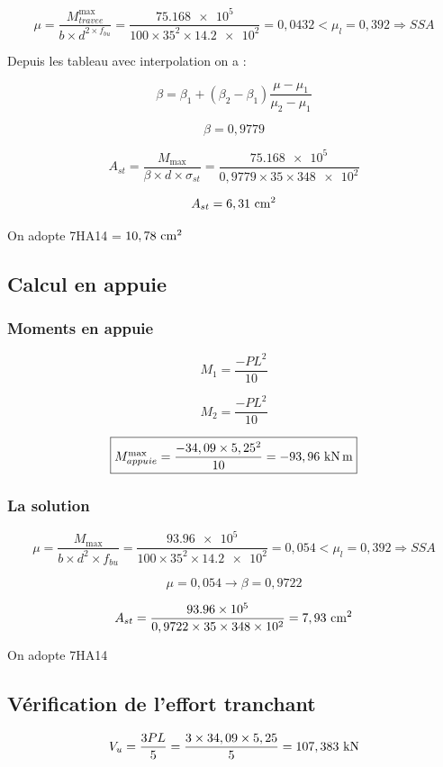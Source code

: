 \documentclass[12pt,a4paper]{report}
\newcommand{\sgma}[1]{\sigma_{#1}}
\begin{document}
	
	\[ \mu = \dfrac{M_{travee}^{\max}}{b \times d^{2 \times f_{bu}}} = \dfrac{\num{75,168e5}}{100 \times 35^{2} \times \num{14,2e2}} = 0,0432 < \mu_{l} = 0,392 \Rightarrow SSA \]
	
	Depuis les tableau avec interpolation on a :
	
	\[ \beta = \beta_{1}  + (\beta_{2} - \beta_{1}) \dfrac{\mu - \mu_{1}}{\mu_{2} - \mu_{1}} \]
	
	\[ \beta = 0,9779 \]
	
	\[ A_{st} = \dfrac{M_{\max}}{\beta \times d \times \sgma{st}} = \dfrac{\num{75,168e5}}{0,9779 \times 35 \times \num{348e2}} \]
	
	\[ A_{st} = 6,31\cmsq \]
	
	On adopte 7HA14 = $10,78\cmsq$
	
	
	\subsection{Calcul en appuie}
	
	
	\subsubsection{Moments en appuie}
	
	\[ M_{1} = \dfrac{-PL^{2}}{10} \]
	
	\[ M_{2} = \dfrac{-PL^{2}}{10} \]
	
	\[ \fbox{$M_{appuie}^{\max} = \dfrac{-34,09 \times 5,25^{2}}{10} = -93,96\knxm$} \]
	
	\subsubsection{La solution}
	
	\[ \mu = \dfrac{M_{\max}}{b \times d^{2} \times f_{bu}} = \dfrac{\num{93,96e5}}{100 \times 35^{2} \times \num{14,2e2}} = 0,054 < \mu_{l} = 0,392 \Rightarrow SSA \]
	
	\[ \mu = 0,054 \rightarrow \beta = 0,9722 \]
	
	\[ A_{st} = \dfrac{\num{93,96e5}}{0,9722 \times 35 \times \num{348e2}} = 7,93\cmsq \]
	
	On adopte 7HA14
	
	
	\subsection{Vérification de l'effort tranchant}
	
	\[ V_{u} = \dfrac{3PL}{5} = \dfrac{3 \times 34,09 \times 5,25}{5} = 107,383\kn \]
	
\end{document}
